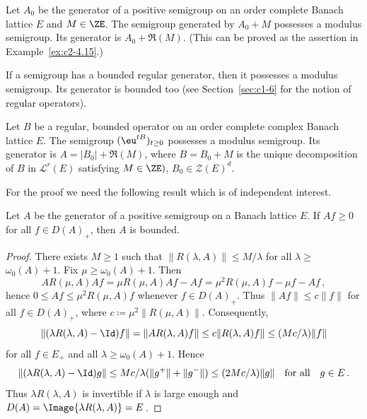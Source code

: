 \begin{example}\label{ex:c2-4.16}
Let $A_{0}$ be the generator of a positive semigroup on an order complete Banach lattice $E$ and $M \in \ZE$.
The semigroup generated by $A_{0} + M$ possesses a modulus semigroup. Its generator is $A_{0} + \Re(M)$. (This can be proved as the assertion in Example~\ref{ex:c2-4.15}.)
\end{example}
If a semigroup has a bounded regular generator, then it possesses a modulus semigroup. Its generator is bounded too (see Section~\ref{sec:c1-6} for the notion of regular operators).
\begin{theorem}\label{thm:c2-4.17}
Let $B$ be a regular, bounded operator on an order complete complex Banach lattice $E$. The semigroup $(\eu^{tB})_{t \geq 0}$ possesses a modulus semigroup. Its generator is $A = |B_{0}| + \Re(M)$, where $B = B_{0} + M$ is the unique decomposition of\/ $B$ in $\mathcal{L}^{r}(E)$ satisfying $M \in \ZE)$, $B_{0} \in \mathcal{Z}(E)^{d}$.
\end{theorem}
For the proof we need the following result which is of independent interest.
\begin{lemma}\label{lem:c2-4.18}
Let $A$ be the generator of a positive semigroup on a Banach lattice $E$. 
If\/ $Af \geq 0$ for all $f \in D(A)_{+}$, then $A$ is bounded.
\end{lemma}
\begin{proof}%
There exists $M \geq 1$ such that $\|R(\lambda,A)\| \leq M/\lambda$ for all $\lambda \geq$ $\omega_{0}(A)+1$.
Fix $\mu \geq \omega_{0}(A)+1$.
Then 
\[
AR(\mu,A)Af = \mu R(\mu,A)Af - Af = \mu^{2}R(\mu,A)f - \mu f - Af\,,
\]
hence $0 \leq Af \leq \mu^{2}R(\mu,A)f$ whenever $f \in D(A)_{+}$.
Thus $\|Af\| \leq c\|f\|$ for all $f \in D(A)_{+}$, where $c \coloneq \mu^{2}\|R(\mu,A)\|$.
Consequently,
\[
\|(\lambda R(\lambda,A) - \Id)f\| = \|AR(\lambda,A)f\| \leq c\|R(\lambda,A)f\| \leq (Mc/\lambda)\|f\| 
\]
for all $f \in E_{+}$ and all $ \lambda \geq \omega_{0}(A)+1$. 
Hence
\[
\|(\lambda R(\lambda,A) - \Id)g\| \leq Mc/\lambda(\|g^{+}\| + \|g^{-}\|) \leq (2Mc/\lambda)\|g\| \quad \text{for all} \quad g \in E\,.
\]
Thus $\lambda R(\lambda,A)$ is invertible if\/ $\lambda$ is large enough and
$D(A) = \Image{\lambda R(\lambda,A)} = E$\,.
\end{proof}
